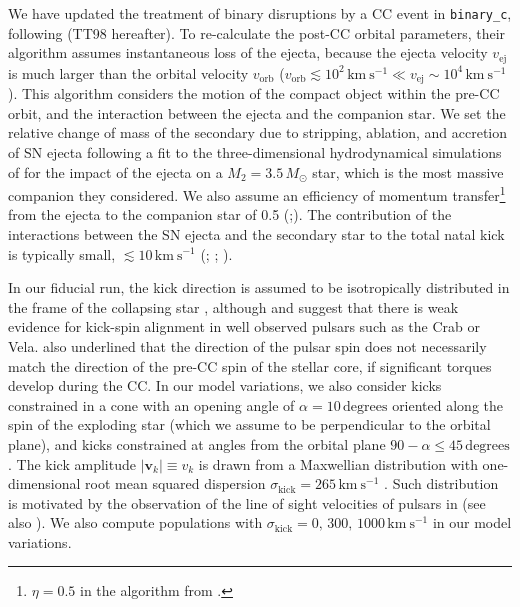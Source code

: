 \documentclass{aa}
\begin{document}
We have updated the treatment of binary disruptions by a CC event in
\texttt{binary\_c}, following \citealt{tauris:98} (TT98 hereafter). To re-calculate the post-CC
orbital parameters, their algorithm
assumes instantaneous
loss of the ejecta, because the ejecta velocity $v_\mathrm{ej}$ is much larger than the
orbital velocity $v_\mathrm{orb}$ ($v_\mathrm{orb} \lesssim 10^2\,\mathrm{km \
  s^{-1}} \ll v_\mathrm{ej}\sim10^4\,\mathrm{km \
  s^{-1}}$). This algorithm considers the motion of the compact
object within the pre-CC orbit, and the interaction between
the ejecta and the companion star. 
We set the
relative change of mass 
of the secondary due to stripping, ablation, and
accretion of SN ejecta following a fit to the three-dimensional
hydrodynamical simulations
of \cite{liu:15} for the impact of the ejecta on a
$M_2=3.5\,M_\odot$ star, which is the most massive companion they
considered. We also assume an efficiency of momentum
transfer\footnote{$\eta=0.5$ in the algorithm from .} from the
ejecta to the companion star of 0.5 (;\citealt{hirai:18}). The contribution of 
the interactions between the SN ejecta and the secondary star to the total natal kick is
typically small, $\lesssim10\,\mathrm{km \ s^{-1}}$
(\citetalias{tauris:98}; \citealt{liu:15}; \citealt{hirai:18}).

In our fiducial run, the kick direction is assumed to be isotropically
distributed in the frame of the collapsing star \citep[][]{wongwathanarat:13,
  bear:17}, although  \cite{johnston:05} and \cite{kaplan:08} suggest that there
is weak evidence for kick-spin alignment in well observed pulsars
such as the Crab or Vela. \cite{johnston:05} also underlined that the
direction of the pulsar spin does not necessarily match the direction
of the pre-CC spin of the stellar core, if significant torques
develop during the CC. In our model
variations, we also consider kicks constrained in a cone with an
opening angle of
$\alpha=10\,\mathrm{degrees}$ oriented along the spin of the exploding
star (which we assume to be perpendicular to the orbital plane), and
kicks constrained at angles from the orbital plane $90 - \alpha
\leq 45\,\mathrm{degrees}$. The kick amplitude $|\mathbf{v}_k| \equiv
v_k$ is drawn from a Maxwellian distribution with one-dimensional root
mean squared dispersion $\sigma_\mathrm{kick}=265\,\mathrm{km \  s^{-1}}$ \citep[][]{hobbs:05}. Such
distribution is motivated by the observation of the line of sight velocities of pulsars in
\cite{hobbs:05} (see also \citealt{lyne:94}). 
We also compute
populations with $\sigma_\mathrm{kick}=0,\,300,\,1000\,\mathrm{km\
  s^{-1}}$ in our model variations.
\end{document}
